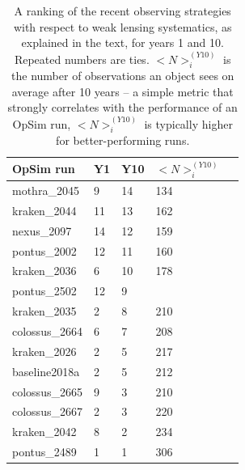 \begin{table}[ht]
\caption{A ranking of the recent observing strategies with respect to weak lensing systematics, as explained in the text, for years 1 and 10. Repeated numbers are ties. $<N>_i^{(Y10)}$ is the number of observations an object sees on average after 10 years -- a simple metric that strongly correlates with the performance of an OpSim run, $<N>_i^{(Y10)}$ is typically higher for better-performing runs.}
\begin{tabular}{lllll}
\label{table:WLSystematicsRankings}
OpSim run & Y1 & Y10 & $<N>_i^{(Y10)}$ \\ \hline
mothra\_2045   & {\color{orange}9} & {\color{red}14}    & 134 \\
kraken\_2044   & {\color{red}11}   & {\color{red}13}    & 162\\
nexus\_2097    & {\color{red}14}   & {\color{red}12}    & 159 \\
pontus\_2002   & {\color{red}12}   & {\color{red}11}    & 160 \\
kraken\_2036   & {\color{yellow}6} & {\color{orange}10} & 178 \\
pontus\_2502   & {\color{red} 12}  & {\color{orange}9}  &  \\
kraken\_2035   & {\color{green}2}  & {\color{yellow}8}  & 210 \\
colossus\_2664 & {\color{yellow}6} & {\color{yellow}7}  & 208\\
kraken\_2026   & {\color{green}2}  & {\color{yellow}5}  & 217\\
baseline2018a  & {\color{green}2}  & {\color{yellow}5}  & 212\\
colossus\_2665 & {\color{orange}9} & {\color{green}3}   & 210 \\ 
colossus\_2667 & {\color{green}2}  & {\color{green}3}   & 220\\
kraken\_2042   & {\color{orange}8} & {\color{green}2}   & 234 \\
pontus\_2489   & {\color{green}1}  & {\color{green}1}   & 306

\end{tabular}
\end{table}
